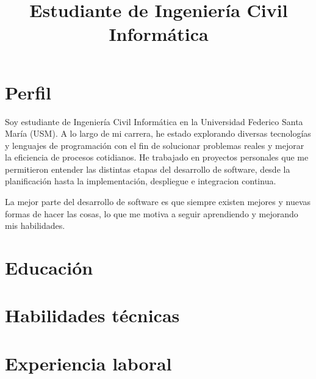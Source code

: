 \documentclass[11pt,a4paper,sans]{moderncv}
\title{Estudiante de Ingeniería Civil Informática}
\begin{document}
\makecvtitle

\section{Perfil}
Soy estudiante de Ingeniería Civil Informática en la Universidad Federico Santa María (USM).
A lo largo de mi carrera, he estado explorando diversas tecnologías y lenguajes de programación con el fin de solucionar problemas reales y mejorar la eficiencia de procesos cotidianos.
He trabajado en proyectos personales que me permitieron entender las distintas etapas del desarrollo de software, desde la planificación hasta la implementación, despliegue e integracion continua.

La mejor parte del desarrollo de software es que siempre existen mejores y nuevas formas de hacer las cosas, lo que me motiva a seguir aprendiendo y mejorando mis habilidades.

\section{Educación}

\section{Habilidades técnicas}

\section{Experiencia laboral}

\end{document}

